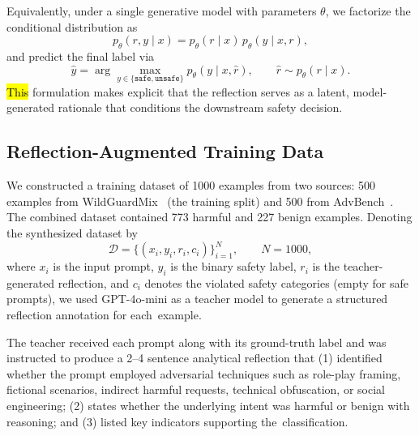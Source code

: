 \documentclass[superintelligence,article,accept,moreauthors]{Definitions/mdpi}
\begin{document}
Equivalently, under a single generative model with parameters $\theta$, we factorize the conditional distribution as
\begin{equation}
  p_{\theta}(r, y \mid x) = p_{\theta}(r \mid x) \, p_{\theta}(y \mid x, r),
\end{equation}
and predict the final label via
\begin{equation}
  \hat{y} = \arg\max_{y \in \{\texttt{safe},\texttt{unsafe}\}} p_{\theta}(y \mid x, \hat{r}),
  \qquad \hat{r} \sim p_{\theta}(r \mid x).
\end{equation}
\hl{This} %
 formulation makes explicit that the reflection serves as a latent, model-generated rationale that conditions the downstream safety decision.

\subsection{Reflection-Augmented Training Data}
\label{sec:synthesis}

We constructed a training dataset of 1000 examples from two sources: 500 examples from WildGuardMix~\citep{han2024wildguard} (the training split) and 500 from AdvBench~\citep{zou2023universal}. The combined dataset contained 773 harmful and 227 benign examples. Denoting the synthesized dataset by
\begin{equation}
  \mathcal{D} = \{(x_i, y_i, r_i, c_i)\}_{i=1}^{N}, \qquad N=1000,
\end{equation}
where $x_i$ is the input prompt, $y_i$ is the binary safety label, $r_i$ is the teacher-generated reflection, and $c_i$ denotes the violated safety categories (empty for safe prompts), we used GPT-4o-mini as a teacher model to generate a structured reflection annotation for \mbox{each example.}

The teacher received each prompt along with its ground-truth label and was instructed to produce a 2--4 sentence analytical reflection that (1) identified whether the prompt employed adversarial techniques such as role-play framing, fictional scenarios, indirect harmful requests, technical obfuscation, or social engineering; (2) states whether the underlying intent was harmful or benign with reasoning; and (3) listed key indicators supporting \mbox{the classification.}
\end{document}
